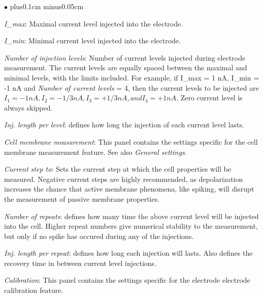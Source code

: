 \documentclass{article}
\newenvironment{myitem}{\begin{list}{$\bullet$}{\setlength{\leftmargin}{1.1em}
\itemsep0.1cm plus0.1cm minus0.05cm
\listparindent0cm
\addtolength{\labelsep}{0.5\labelsep}
\setlength{\labelwidth}{0.8em}
\setlength{\leftmargin}{\labelwidth}
\addtolength{\leftmargin}{\labelsep}
}}{\end{list}}
\begin{document}
\begin{myitem}
\item \emph{I\_max}: Maximal current level injected into the electrode.
\item \emph{I\_min}: Minimal current level injected into the electrode.
\item \emph{Number of injection levels}: Number of current levels
  injected during electrode measurement. The current levels are equally
  spaced between the maximal and minimal levels, with the limits
  included. For example, if I\_max = 1 nA, I\_min = -1 nA and \emph{Number of
  current levels} = 4, then the current levels to be injected are $I_1 =
  -1 nA, I_2 = -1/3 nA, I_3 = +1/3 nA, and I_4 = +1 nA$. Zero current level
  is always skipped.
\item \emph{Inj. length per level}: defines how long the injection of each
  current level lasts. 
\item \emph{Cell membrane measurement}: This panel contains the settings specific for
  the cell membrane measurement feature. See also \emph{General settings}. 
\item \emph{Current step to}: Sets the current step at which the cell
  properties will be measured. Negative current steps are highly
  recommended, as depolarization increases the chance that active membrane
  phenomena, like spiking, will disrupt the measurement of passive membrane
  properties. 
\item \emph{Number of repeats}: defines how many time the above current level
  will be injected into the cell. Higher repeat numbers give numerical
  stability to the measurement, but only if no spike has occured during any
  of the injections. 
\item \emph{Inj. length per repeat}: defines how long each injection will
  lasts. Also defines the recovery time in between current level injections. 
\end{myitem}
\emph{Calibration}: This panel contains the settings specific for
  the electrode electrode calibration feature.
\end{document}
